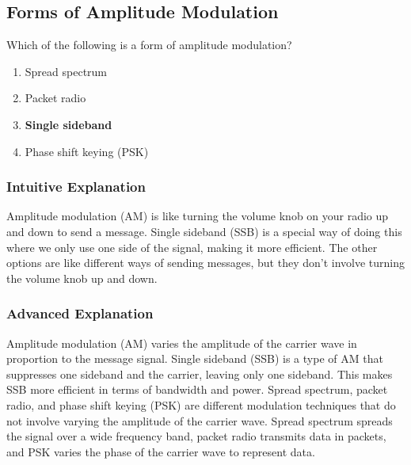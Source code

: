 \subsection{Forms of Amplitude Modulation}
\label{T8A01}

\begin{tcolorbox}[colback=gray!10!white,colframe=black!75!black,title=T8A01]
Which of the following is a form of amplitude modulation?
\begin{enumerate}[noitemsep]
    \item Spread spectrum
    \item Packet radio
    \item \textbf{Single sideband}
    \item Phase shift keying (PSK)
\end{enumerate}
\end{tcolorbox}

\subsubsection*{Intuitive Explanation}
Amplitude modulation (AM) is like turning the volume knob on your radio up and down to send a message. Single sideband (SSB) is a special way of doing this where we only use one side of the signal, making it more efficient. The other options are like different ways of sending messages, but they don't involve turning the volume knob up and down.

\subsubsection*{Advanced Explanation}
Amplitude modulation (AM) varies the amplitude of the carrier wave in proportion to the message signal. Single sideband (SSB) is a type of AM that suppresses one sideband and the carrier, leaving only one sideband. This makes SSB more efficient in terms of bandwidth and power. Spread spectrum, packet radio, and phase shift keying (PSK) are different modulation techniques that do not involve varying the amplitude of the carrier wave. Spread spectrum spreads the signal over a wide frequency band, packet radio transmits data in packets, and PSK varies the phase of the carrier wave to represent data.